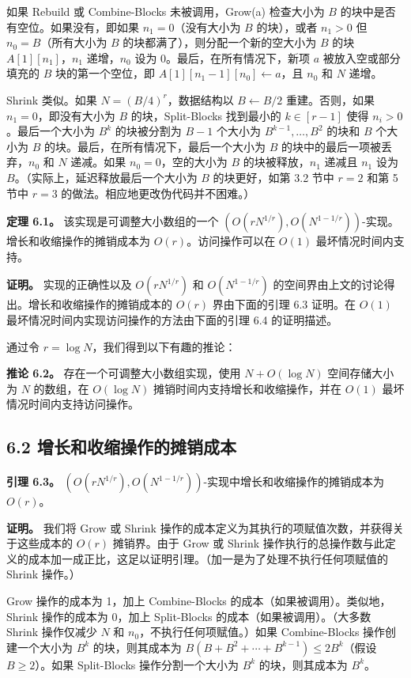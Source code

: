 \documentclass[12pt,a4paper]{ctexart}
\theoremstyle{remark}
\begin{document}
如果 Rebuild 或 Combine-Blocks 未被调用，Grow(a) 检查大小为 $B$ 的块中是否有空位。如果没有，即如果 $n_1=0$（没有大小为 $B$ 的块），或者 $n_1>0$ 但 $n_0=B$（所有大小为 $B$ 的块都满了），则分配一个新的空大小为 $B$ 的块 $A[1][n_1]$，$n_1$ 递增，$n_0$ 设为 0。最后，在所有情况下，新项 $a$ 被放入空或部分填充的 $B$ 块的第一个空位，即 $A[1][n_1-1][n_0]\leftarrow a$，且 $n_0$ 和 $N$ 递增。

Shrink 类似。如果 $N=(B/4)^r$，数据结构以 $B\leftarrow B/2$ 重建。否则，如果 $n_1=0$，即没有大小为 $B$ 的块，Split-Blocks 找到最小的 $k\in[r-1]$ 使得 $n_i>0$。最后一个大小为 $B^k$ 的块被分割为 $B-1$ 个大小为 $B^{k-1},\ldots,B^2$ 的块和 $B$ 个大小为 $B$ 的块。最后，在所有情况下，最后一个大小为 $B$ 的块中的最后一项被丢弃，$n_0$ 和 $N$ 递减。如果 $n_0=0$，空的大小为 $B$ 的块被释放，$n_1$ 递减且 $n_1$ 设为 $B$。（实际上，延迟释放最后一个大小为 $B$ 的块更好，如第 3.2 节中 $r=2$ 和第 5 节中 $r=3$ 的做法。相应地更改伪代码并不困难。）

\textbf{定理 6.1。} 该实现是可调整大小数组的一个 $(O(rN^{1/r}),O(N^{1-1/r}))$-实现。增长和收缩操作的摊销成本为 $O(r)$。访问操作可以在 $O(1)$ 最坏情况时间内支持。

\textbf{证明。} 实现的正确性以及 $O(rN^{1/r})$ 和 $O(N^{1-1/r})$ 的空间界由上文的讨论得出。增长和收缩操作的摊销成本的 $O(r)$ 界由下面的引理 6.3 证明。在 $O(1)$ 最坏情况时间内实现访问操作的方法由下面的引理 6.4 的证明描述。

通过令 $r=\log N$，我们得到以下有趣的推论：

\textbf{推论 6.2。} 存在一个可调整大小数组实现，使用 $N+O(\log N)$ 空间存储大小为 $N$ 的数组，在 $O(\log N)$ 摊销时间内支持增长和收缩操作，并在 $O(1)$ 最坏情况时间内支持访问操作。

\subsection{6.2 增长和收缩操作的摊销成本}

\textbf{引理 6.3。} $(O(rN^{1/r}),O(N^{1-1/r}))$-实现中增长和收缩操作的摊销成本为 $O(r)$。

\textbf{证明。} 我们将 Grow 或 Shrink 操作的成本定义为其执行的项赋值次数，并获得关于这些成本的 $O(r)$ 摊销界。由于 Grow 或 Shrink 操作执行的总操作数与此定义的成本加一成正比，这足以证明引理。（加一是为了处理不执行任何项赋值的 Shrink 操作。）

Grow 操作的成本为 1，加上 Combine-Blocks 的成本（如果被调用）。类似地，Shrink 操作的成本为 0，加上 Split-Blocks 的成本（如果被调用）。（大多数 Shrink 操作仅减少 $N$ 和 $n_0$，不执行任何项赋值。）如果 Combine-Blocks 操作创建一个大小为 $B^k$ 的块，则其成本为 $B(B+B^2+\cdots+B^{k-1})\leq 2B^k$（假设 $B\geq 2$）。如果 Split-Blocks 操作分割一个大小为 $B^k$ 的块，则其成本为 $B^k$。
\end{document}
